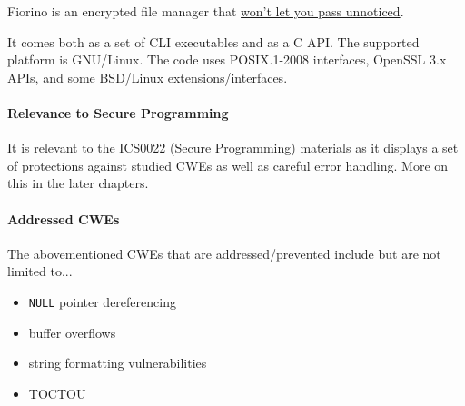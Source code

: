 Fiorino is an encrypted file manager that 
\href{https://www.youtube.com/watch?v=te7XM8RCfxQ}{won't let you pass unnoticed}.

It comes both as a set of CLI executables and as a C API. The supported platform
is GNU/Linux. The code uses POSIX.1-2008 interfaces, OpenSSL 3.x APIs, and some
BSD/Linux extensions/interfaces.

\paragraph{Relevance to Secure Programming}
It is relevant to the ICS0022 (Secure Programming) materials as it displays a set
of protections against studied CWEs as well as careful error handling.
More on this in the later chapters.

\paragraph{Addressed CWEs}
The abovementioned CWEs that are addressed/prevented include but are not limited to...

\begin{itemize}
    \item \texttt{NULL} pointer dereferencing
    \item buffer overflows
    \item string formatting vulnerabilities
    \item TOCTOU
\end{itemize}
